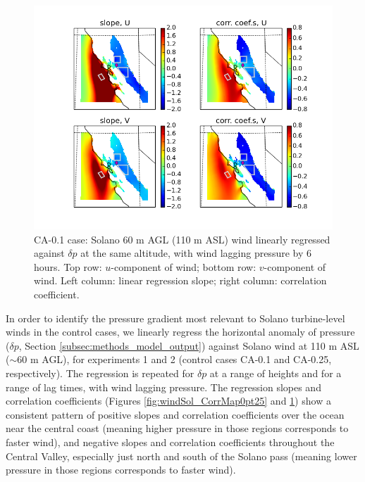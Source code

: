 \begin{figure}[here]
\includegraphics[width=1\textwidth]{ch3-wind/img/corr_wind_panom_lev110_lag12_CA0pt1.png}
\caption{CA-0.1 case: Solano 60 m AGL (110 m ASL) wind linearly regressed against $\delta p$ at the same altitude, with wind lagging pressure by 6 hours.  Top row: $u$-component of wind; bottom row: $v$-component of wind.  Left column: linear regression slope; right column: correlation coefficient.}
\label{fig:windSol_CorrMap0pt1}
\end{figure}

In order to identify the pressure gradient most relevant to Solano turbine-level winds in the control cases, we linearly regress the horizontal anomaly of pressure ($\delta p$, Section \ref{subsec:methods_model_output}) against Solano wind at 110 m ASL ($\sim$60 m AGL), for experiments 1 and 2 (control cases CA-0.1 and CA-0.25, respectively).  The regression is repeated for $\delta p$ at a range of heights and for a range of lag times, with wind lagging pressure.  The regression slopes and correlation coefficients (Figures \ref{fig:windSol_CorrMap0pt25} and \ref{fig:windSol_CorrMap0pt1}) show a consistent pattern of positive slopes and correlation coefficients over the ocean near the central coast (meaning higher pressure in those regions corresponds to faster wind), and negative slopes and correlation coefficients throughout the Central Valley, especially just north and south of the Solano pass (meaning lower pressure in those regions corresponds to faster wind).

